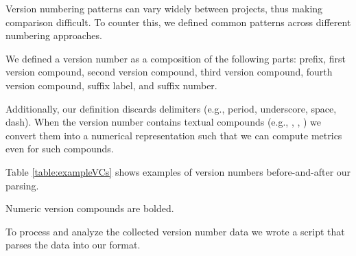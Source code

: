 \documentclass[conference]{IEEEtran}
\begin{document}
 Version numbering patterns can vary widely between projects, thus making comparison difficult. 
To counter this, we defined common patterns across different numbering approaches. 

We defined a version number as a composition of the following parts: 
prefix, first version compound, second
 version compound, third version compound, fourth version compound, suffix label, and suffix number. 

Additionally, our definition discards delimiters (e.g., period, underscore, space, dash). When the version number contains textual compounds (e.g., , , ) we convert them into a numerical representation such that we can compute metrics even for such compounds. 

Table \ref{table:exampleVCs} shows examples of version numbers before-and-after 
our parsing.
 
 \begin{table*}[htb]
 \begin{center}
 \begin{adjustbox}{width=\textwidth}

\end{adjustbox}
\end{center}
\caption{Numeric version compounds are bolded. }
\label{table:exampleVCs}
\end{table*}
 
 
 
 To process and analyze the collected version number data we wrote a script that parses the data into our format. 








\end{document}
